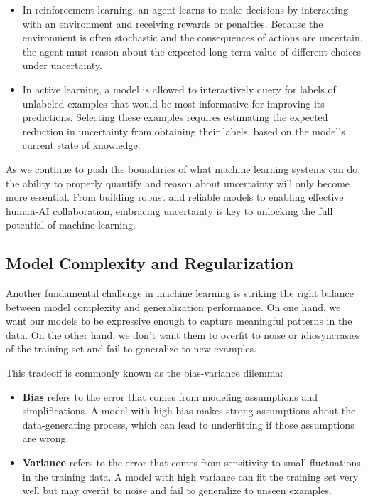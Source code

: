 \documentclass[
  9pt,
  letterpaper,
  abstract,
  titlepage]{scrbook}
\begin{document}
\begin{itemize}
\item
  In reinforcement learning, an agent learns to make decisions by
  interacting with an environment and receiving rewards or penalties.
  Because the environment is often stochastic and the consequences of
  actions are uncertain, the agent must reason about the expected
  long-term value of different choices under uncertainty.
\item
  In active learning, a model is allowed to interactively query for
  labels of unlabeled examples that would be most informative for
  improving its predictions. Selecting these examples requires
  estimating the expected reduction in uncertainty from obtaining their
  labels, based on the model's current state of knowledge.
\end{itemize}

As we continue to push the boundaries of what machine learning systems
can do, the ability to properly quantify and reason about uncertainty
will only become more essential. From building robust and reliable
models to enabling effective human-AI collaboration, embracing
uncertainty is key to unlocking the full potential of machine learning.

\subsection{Model Complexity and
Regularization}\label{model-complexity-and-regularization}

Another fundamental challenge in machine learning is striking the right
balance between model complexity and generalization performance. On one
hand, we want our models to be expressive enough to capture meaningful
patterns in the data. On the other hand, we don't want them to overfit
to noise or idiosyncrasies of the training set and fail to generalize to
new examples.

This tradeoff is commonly known as the bias-variance dilemma:

\begin{itemize}
\item
  \textbf{Bias} refers to the error that comes from modeling assumptions
  and simplifications. A model with high bias makes strong assumptions
  about the data-generating process, which can lead to underfitting if
  those assumptions are wrong.
\item
  \textbf{Variance} refers to the error that comes from sensitivity to
  small fluctuations in the training data. A model with high variance
  can fit the training set very well but may overfit to noise and fail
  to generalize to unseen examples.
\end{itemize}
\end{document}
